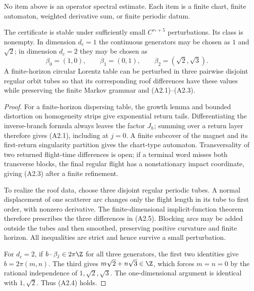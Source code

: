 No item above is an operator spectral estimate.  Each item is a finite chart,
finite automaton, weighted derivative sum, or finite periodic datum.

\begin{proposition}
\label{prop:r29-a2-certificate}
The certificate is stable under sufficiently small $C^{r_*+5}$ perturbations.
Its class is nonempty.  In dimension $d_c=1$ the continuous generators may be
chosen as $1$ and $\sqrt2$; in dimension $d_c=2$ they may be chosen as
\[
 \beta_0=(1,0),\qquad \beta_1=(0,1),\qquad
 \beta_2=(\sqrt2,\sqrt3).                                \tag{A2.5}
\]
A finite-horizon circular Lorentz table can be perturbed in three pairwise
disjoint regular orbit tubes so that its corresponding roof differences have
these values while preserving the finite Markov grammar and (A2.1)--(A2.3).
\end{proposition}

\begin{proof}
For a finite-horizon dispersing table, the growth lemma and bounded distortion
on homogeneity strips give exponential return tails.  Differentiating the
inverse-branch formula always leaves the factor $J_h$; summing over a return
layer therefore gives (A2.1), including at $j=0$.  A finite subcover of the
magnet and its first-return singularity partition gives the chart-type
automaton.  Transversality of two returned flight-time differences is open;
if a terminal word misses both transverse blocks, the final regular flight
has a nonstationary impact coordinate, giving (A2.3) after a finite
refinement.

To realize the roof data, choose three disjoint regular periodic tubes.  A
normal displacement of one scatterer arc changes only the flight length in
its tube to first order, with nonzero derivative.  The finite-dimensional
implicit-function theorem therefore prescribes the three differences in
(A2.5).  Blocking arcs may be added outside the tubes and then smoothed,
preserving positive curvature and finite horizon.  All inequalities are
strict and hence survive a small perturbation.

For $d_c=2$, if $b\cdot\beta_j\in2\pi\Z$ for all three generators, the first
two identities give $b=2\pi(m,n)$.  The third gives
$m\sqrt2+n\sqrt3\in\Z$, which forces $m=n=0$ by the rational independence of
$1,\sqrt2,\sqrt3$.  The one-dimensional argument is identical with
$1,\sqrt2$.  Thus (A2.4) holds.
\end{proof}

